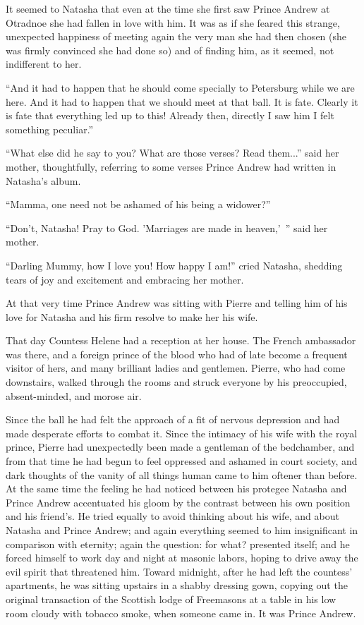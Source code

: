 It seemed to Natasha that even at the time she first saw Prince
Andrew at Otradnoe she had fallen in love with him. It was as if
she feared this strange, unexpected happiness of meeting again
the very man she had then chosen (she was firmly convinced she
had done so) and of finding him, as it seemed, not indifferent to
her.

``And it had to happen that he should come specially to
Petersburg while we are here. And it had to happen that we should
meet at that ball. It is fate. Clearly it is fate that everything
led up to this! Already then, directly I saw him I felt something
peculiar.''

``What else did he say to you? What are those verses? Read
them...'' said her mother, thoughtfully, referring to some verses
Prince Andrew had written in Natasha's album.

``Mamma, one need not be ashamed of his being a widower?''

``Don't, Natasha! Pray to God. 'Marriages are made in
heaven,'\ '' said her mother.

``Darling Mummy, how I love you! How happy I am!'' cried Natasha,
shedding tears of joy and excitement and embracing her mother.

At that very time Prince Andrew was sitting with Pierre and
telling him of his love for Natasha and his firm resolve to make
her his wife.

That day Countess Helene had a reception at her house. The French
ambassador was there, and a foreign prince of the blood who had
of late become a frequent visitor of hers, and many brilliant
ladies and gentlemen. Pierre, who had come downstairs, walked
through the rooms and struck everyone by his preoccupied,
absent-minded, and morose air.

Since the ball he had felt the approach of a fit of nervous
depression and had made desperate efforts to combat it. Since the
intimacy of his wife with the royal prince, Pierre had
unexpectedly been made a gentleman of the bedchamber, and from
that time he had begun to feel oppressed and ashamed in court
society, and dark thoughts of the vanity of all things human came
to him oftener than before. At the same time the feeling he had
noticed between his protegee Natasha and Prince Andrew
accentuated his gloom by the contrast between his own position
and his friend's. He tried equally to avoid thinking about his
wife, and about Natasha and Prince Andrew; and again everything
seemed to him insignificant in comparison with eternity; again
the question: for what?  presented itself; and he forced himself
to work day and night at masonic labors, hoping to drive away the
evil spirit that threatened him. Toward midnight, after he had
left the countess' apartments, he was sitting upstairs in a
shabby dressing gown, copying out the original transaction of the
Scottish lodge of Freemasons at a table in his low room cloudy
with tobacco smoke, when someone came in. It was Prince Andrew.

